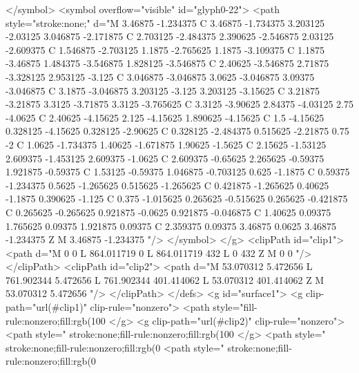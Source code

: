 </symbol>
<symbol overflow="visible" id="glyph0-22">
<path style="stroke:none;" d="M 3.46875 -1.234375 C 3.46875 -1.734375 3.203125 -2.03125 3.046875 -2.171875 C 2.703125 -2.484375 2.390625 -2.546875 2.03125 -2.609375 C 1.546875 -2.703125 1.1875 -2.765625 1.1875 -3.109375 C 1.1875 -3.46875 1.484375 -3.546875 1.828125 -3.546875 C 2.40625 -3.546875 2.71875 -3.328125 2.953125 -3.125 C 3.046875 -3.046875 3.0625 -3.046875 3.09375 -3.046875 C 3.1875 -3.046875 3.203125 -3.125 3.203125 -3.15625 C 3.21875 -3.21875 3.3125 -3.71875 3.3125 -3.765625 C 3.3125 -3.90625 2.84375 -4.03125 2.75 -4.0625 C 2.40625 -4.15625 2.125 -4.15625 1.890625 -4.15625 C 1.5 -4.15625 0.328125 -4.15625 0.328125 -2.90625 C 0.328125 -2.484375 0.515625 -2.21875 0.75 -2 C 1.0625 -1.734375 1.40625 -1.671875 1.90625 -1.5625 C 2.15625 -1.53125 2.609375 -1.453125 2.609375 -1.0625 C 2.609375 -0.65625 2.265625 -0.59375 1.921875 -0.59375 C 1.53125 -0.59375 1.046875 -0.703125 0.625 -1.1875 C 0.59375 -1.234375 0.5625 -1.265625 0.515625 -1.265625 C 0.421875 -1.265625 0.40625 -1.1875 0.390625 -1.125 C 0.375 -1.015625 0.265625 -0.515625 0.265625 -0.421875 C 0.265625 -0.265625 0.921875 -0.0625 0.921875 -0.046875 C 1.40625 0.09375 1.765625 0.09375 1.921875 0.09375 C 2.359375 0.09375 3.46875 0.0625 3.46875 -1.234375 Z M 3.46875 -1.234375 "/>
</symbol>
</g>
<clipPath id="clip1">
  <path d="M 0 0 L 864.011719 0 L 864.011719 432 L 0 432 Z M 0 0 "/>
</clipPath>
<clipPath id="clip2">
  <path d="M 53.070312 5.472656 L 761.902344 5.472656 L 761.902344 401.414062 L 53.070312 401.414062 Z M 53.070312 5.472656 "/>
</clipPath>
</defs>
<g id="surface1">
<g clip-path="url(#clip1)" clip-rule="nonzero">
<path style="fill-rule:nonzero;fill:rgb(100%
</g>
<g clip-path="url(#clip2)" clip-rule="nonzero">
<path style=" stroke:none;fill-rule:nonzero;fill:rgb(100%
</g>
<path style=" stroke:none;fill-rule:nonzero;fill:rgb(0%
<path style=" stroke:none;fill-rule:nonzero;fill:rgb(0%
